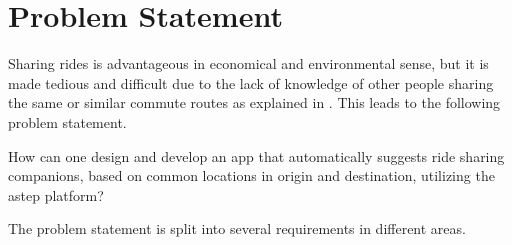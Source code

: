 \section{Problem Statement}
Sharing rides is advantageous in economical and environmental sense, but it is made tedious and difficult due to the lack of knowledge of other people sharing the same or similar commute routes as explained in \cite{doi:10.1080/01441647.2011.621557}. This leads to the following problem statement.

{\addtolength{\leftskip}{10mm}\addtolength{\rightskip}{10mm}\noindent\hrulefill\it

\noindent How can one design and develop an app that automatically suggests ride sharing companions, based on common locations in origin and destination, utilizing the \gls{astep} platform? 

\noindent\hrulefill

}

The problem statement is split into several requirements in different areas.